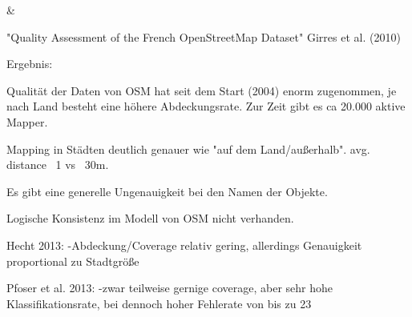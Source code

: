 \&

"Quality Assessment of the French OpenStreetMap Dataset" Girres et al. (2010)

Ergebnis:

Qualität der Daten von OSM hat seit dem Start (2004) enorm zugenommen, je nach Land besteht eine höhere Abdeckungsrate. Zur Zeit gibt es ca 20.000 aktive Mapper.

Mapping in Städten deutlich genauer wie "auf dem Land/außerhalb".  avg. distance ~1 vs ~30m.

Es gibt eine generelle Ungenauigkeit bei den Namen der Objekte.

Logische Konsistenz im Modell von OSM nicht verhanden.

Hecht 2013:
-Abdeckung/Coverage relativ gering, allerdings Genauigkeit proportional zu Stadtgröße

Pfoser et al. 2013:
-zwar teilweise gernige coverage, aber sehr hohe Klassifikationsrate, bei dennoch hoher Fehlerate von bis zu 23%
